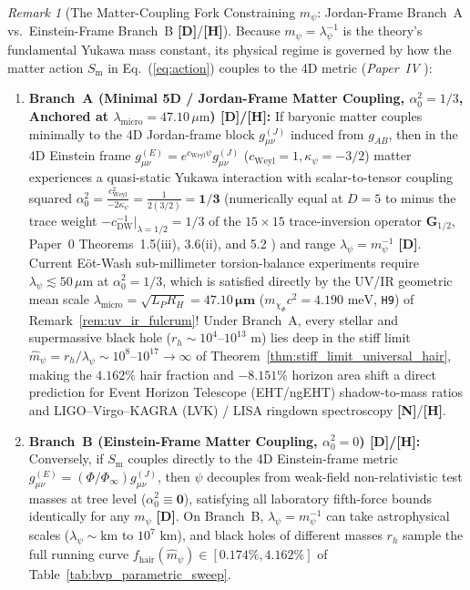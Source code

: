 \documentclass[11pt,a4paper]{article}
\newcommand{\catD}{\textbf{\textcolor{blue!75!black}{[D]}}}
\newcommand{\catH}{\textbf{\textcolor{orange!85!black}{[H]}}}
\newcommand{\catN}{\textbf{\textcolor{teal!75!black}{[N]}}}
\theoremstyle{definition}
\theoremstyle{remark}
\newtheorem{remark}[theorem]{Remark}
\begin{document}
\begin{remark}[The Matter-Coupling Fork Constraining $m_{\psi}$: Jordan-Frame Branch~A vs.\ Einstein-Frame Branch~B \catD/\catH]
\label{rem:matter_coupling_fork}
Because $m_{\psi} = \lambda_{\psi}^{-1}$ is the theory's fundamental Yukawa mass constant, its physical regime is governed by how the matter action $S_{\text{m}}$ in Eq.~(\ref{eq:action}) couples to the 4D metric (\textit{Paper~IV} \cite{JV_Paper4}):
\begin{enumerate}
  \item[\textnormal{(i)}] \textbf{Branch~A (Minimal 5D / Jordan-Frame Matter Coupling, $\alpha_0^2 = 1/3$, Anchored at $\lambda_{\text{micro}} = 47.10\,\mu\text{m}$) \catD/\catH:} If baryonic matter couples minimally to the 4D Jordan-frame block $g_{\mu\nu}^{(J)}$ induced from $g_{AB}$, then in the 4D Einstein frame $g_{\mu\nu}^{(E)} = e^{c_{\text{Weyl}}\psi}g_{\mu\nu}^{(J)}$ ($c_{\text{Weyl}} = 1, \kappa_\psi = -3/2$) matter experiences a quasi-static Yukawa interaction with scalar-to-tensor coupling squared $\alpha_0^2 = \frac{c_{\text{Weyl}}^2}{-2\kappa_\psi} = \frac{1}{2(3/2)} = \mathbf{1/3}$ (numerically equal at $D = 5$ to minus the trace weight $-c_{\text{DW}}^{-1}\big|_{\lambda=1/2} = 1/3$ of the $15\times 15$ trace-inversion operator $\mathbf{G}_{1/2}$, Paper~0 Theorems~1.5(iii), 3.6(ii), and 5.2 \cite{JV_Paper0}) and range $\lambda_{\psi} = m_{\psi}^{-1}$ \catD. Current E\"ot-Wash sub-millimeter torsion-balance experiments \cite{Kapner2007_EotWash} require $\lambda_{\psi} \lesssim 50\,\mu\text{m}$ at $\alpha_0^2 = 1/3$, which is satisfied directly by the UV/IR geometric mean scale $\lambda_{\text{micro}} = \sqrt{L_P R_H} = \mathbf{47.10\,\mu\text{m}}$ ($m_{\chi_{\Phi}}c^2 = 4.190\text{ meV}$, \texttt{H9}) of Remark~\ref{rem:uv_ir_fulcrum}! Under Branch~A, every stellar and supermassive black hole ($r_h \sim 10^4\text{--}10^{13}\text{ m}$) lies deep in the stiff limit $\hat{m}_{\psi} = r_h/\lambda_{\psi} \sim 10^8\text{--}10^{17} \to \infty$ of Theorem~\ref{thm:stiff_limit_universal_hair}, making the $\mathbf{4.162\%}$ hair fraction and $\mathbf{-8.151\%}$ horizon area shift a direct prediction for Event Horizon Telescope (EHT/ngEHT) shadow-to-mass ratios and LIGO--Virgo--KAGRA (LVK) / LISA ringdown spectroscopy \catN/\catH.
  \item[\textnormal{(ii)}] \textbf{Branch~B (Einstein-Frame Matter Coupling, $\alpha_0^2 = 0$) \catD/\catH:} Conversely, if $S_{\text{m}}$ couples directly to the 4D Einstein-frame metric $g_{\mu\nu}^{(E)} = (\Phi/\Phi_{\infty})g_{\mu\nu}^{(J)}$, then $\psi$ decouples from weak-field non-relativistic test masses at tree level ($\alpha_0^2 \equiv \mathbf{0}$), satisfying all laboratory fifth-force bounds identically for any $m_{\psi}$ \catD. On Branch~B, $\lambda_{\psi} = m_{\psi}^{-1}$ can take astrophysical scales ($\lambda_{\psi} \sim \text{km}$ to $10^7\text{ km}$), and black holes of different masses $r_h$ sample the full running curve $f_{\text{hair}}(\hat{m}_{\psi}) \in [0.174\%, 4.162\%]$ of Table~\ref{tab:bvp_parametric_sweep}.
\end{enumerate}
\end{remark}
\end{document}
